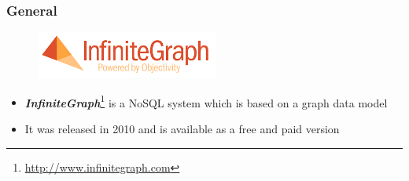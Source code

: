 
\begin{frame}
\frametitle{General}
\begin{figure}[htb]
 	\centering
  	\includegraphics[width=6cm]{images/logo}
\end{figure}
\begin{itemize}
	\item \emph{\textbf{InfiniteGraph}}\footnote{\url{http://www.infinitegraph.com}} is a NoSQL system which is based on a graph data model
	\item It was released in 2010 and is available as a free and paid version
\end{itemize}
\end{frame} 